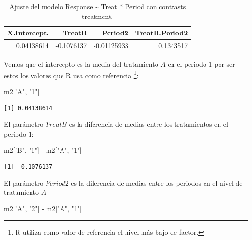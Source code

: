 \documentclass[
  12pt,
  a4paper,
  extrafontsizes,
  onecolumn,
  openright]{memoir}
\newenvironment{Shaded}{\begin{snugshade}}{\end{snugshade}}
\newcommand{\NormalTok}[1]{\textcolor[rgb]{0.00,0.23,0.31}{#1}}
\newcommand{\SpecialCharTok}[1]{\textcolor[rgb]{0.37,0.37,0.37}{#1}}
\newcommand{\StringTok}[1]{\textcolor[rgb]{0.13,0.47,0.30}{#1}}
\begin{document}
\hypertarget{tbl-l2}{}
\begin{longtable}{rrrr}
\caption{\label{tbl-l2}Ajuste del modelo Response \textasciitilde{} Treat * Period con
contrasts treatment. }\tabularnewline

\toprule
X.Intercept. & TreatB & Period2 & TreatB.Period2 \\ 
\midrule
0.04138614 & -0.1076137 & -0.01125933 & 0.1343517 \\ 
\bottomrule
\end{longtable}

\normalsize

Vemos que el intercepto es la media del tratamiento \(A\) en el periodo
\(1\) por ser estos los valores que R usa como referencia \footnote{R
  utiliza como valor de referencia el nivel más bajo de factor.}:

\scriptsize

\begin{Shaded}
\begin{Highlighting}[]
\NormalTok{m2[}\StringTok{"A"}\NormalTok{, }\StringTok{"1"}\NormalTok{]}
\end{Highlighting}
\end{Shaded}

\begin{verbatim}
[1] 0.04138614
\end{verbatim}

\normalsize

El parámetro \(TreatB\) es la diferencia de medias entre los
tratamientos en el periodo \(1\):

\scriptsize

\begin{Shaded}
\begin{Highlighting}[]
\NormalTok{m2[}\StringTok{"B"}\NormalTok{, }\StringTok{"1"}\NormalTok{] }\SpecialCharTok{{-}}\NormalTok{ m2[}\StringTok{"A"}\NormalTok{, }\StringTok{"1"}\NormalTok{]}
\end{Highlighting}
\end{Shaded}

\begin{verbatim}
[1] -0.1076137
\end{verbatim}

\normalsize

El parámetro \(Period2\) es la diferencia de medias entre los periodos
en el nivel de tratamiento \(A\):

\scriptsize

\begin{Shaded}
\begin{Highlighting}[]
\NormalTok{m2[}\StringTok{"A"}\NormalTok{, }\StringTok{"2"}\NormalTok{] }\SpecialCharTok{{-}}\NormalTok{ m2[}\StringTok{"A"}\NormalTok{, }\StringTok{"1"}\NormalTok{]}
\end{Highlighting}
\end{Shaded}
\end{document}
